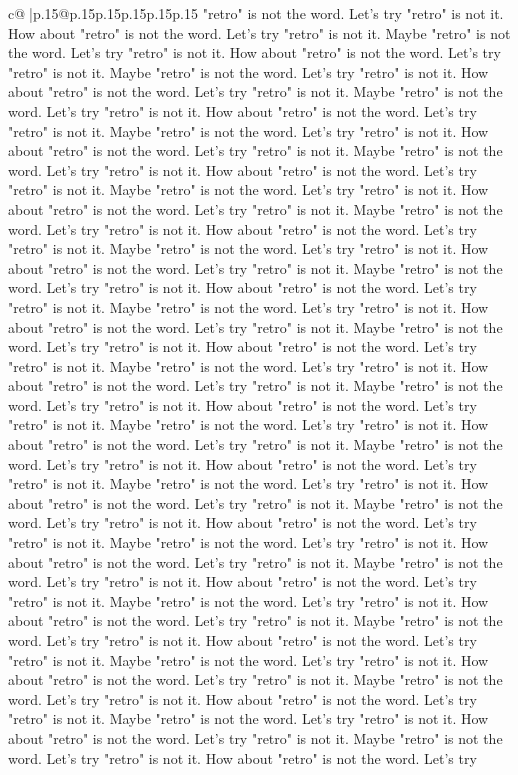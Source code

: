 \documentclass{article}
\begin{document}
{\begin{supertabular}{c@{$\;$}|p{.15\linewidth}@{}p{.15\linewidth}p{.15\linewidth}p{.15\linewidth}p{.15\linewidth}p{.15\linewidth}}
{{{"retro" is not the word. Let's try "retro" is not it. How about "retro" is not the word. Let's try "retro" is not it. Maybe "retro" is not the word. Let's try "retro" is not it. How about "retro" is not the word. Let's try "retro" is not it. Maybe "retro" is not the word. Let's try "retro" is not it. How about "retro" is not the word. Let's try "retro" is not it. Maybe "retro" is not the word. Let's try "retro" is not it. How about "retro" is not the word. Let's try "retro" is not it. Maybe "retro" is not the word. Let's try "retro" is not it. How about "retro" is not the word. Let's try "retro" is not it. Maybe "retro" is not the word. Let's try "retro" is not it. How about "retro" is not the word. Let's try "retro" is not it. Maybe "retro" is not the word. Let's try "retro" is not it. How about "retro" is not the word. Let's try "retro" is not it. Maybe "retro" is not the word. Let's try "retro" is not it. How about "retro" is not the word. Let's try "retro" is not it. Maybe "retro" is not the word. Let's try "retro" is not it. How about "retro" is not the word. Let's try "retro" is not it. Maybe "retro" is not the word. Let's try "retro" is not it. How about "retro" is not the word. Let's try "retro" is not it. Maybe "retro" is not the word. Let's try "retro" is not it. How about "retro" is not the word. Let's try "retro" is not it. Maybe "retro" is not the word. Let's try "retro" is not it. How about "retro" is not the word. Let's try "retro" is not it. Maybe "retro" is not the word. Let's try "retro" is not it. How about "retro" is not the word. Let's try "retro" is not it. Maybe "retro" is not the word. Let's try "retro" is not it. How about "retro" is not the word. Let's try "retro" is not it. Maybe "retro" is not the word. Let's try "retro" is not it. How about "retro" is not the word. Let's try "retro" is not it. Maybe "retro" is not the word. Let's try "retro" is not it. How about "retro" is not the word. Let's try "retro" is not it. Maybe "retro" is not the word. Let's try "retro" is not it. How about "retro" is not the word. Let's try "retro" is not it. Maybe "retro" is not the word. Let's try "retro" is not it. How about "retro" is not the word. Let's try "retro" is not it. Maybe "retro" is not the word. Let's try "retro" is not it. How about "retro" is not the word. Let's try "retro" is not it. Maybe "retro" is not the word. Let's try "retro" is not it. How about "retro" is not the word. Let's try "retro" is not it. Maybe "retro" is not the word. Let's try "retro" is not it. How about "retro" is not the word. Let's try "retro" is not it. Maybe "retro" is not the word. Let's try "retro" is not it. How about "retro" is not the word. Let's try "retro" is not it. Maybe "retro" is not the word. Let's try "retro" is not it. How about "retro" is not the word. Let's try "retro" is not it. Maybe "retro" is not the word. Let's try "retro" is not it. How about "retro" is not the word. Let's try "retro" is not it. Maybe "retro" is not the word. Let's try "retro" is not it. How about "retro" is not the word. Let's try "retro" is not it. Maybe "retro" is not the word. Let's try "retro" is not it. How about "retro" is not the word. Let's try }}}
\end{supertabular}}
\end{document}
